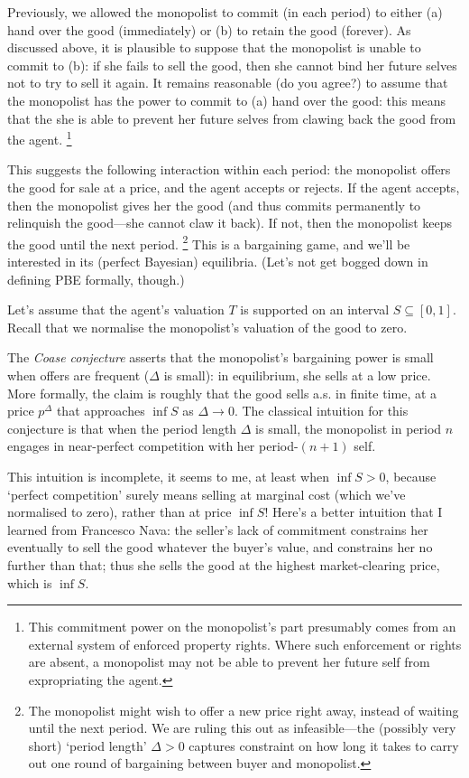 Previously, we allowed the monopolist to commit (in each period) to either (a) hand over the good (immediately) or (b) to retain the good (forever).
As discussed above, it is plausible to suppose that the monopolist is unable to commit to (b): if she fails to sell the good, then she cannot bind her future selves not to try to sell it again.
It remains reasonable (do you agree?) to assume that the monopolist has the power to commit to (a) hand over the good: this means that the she is able to prevent her future selves from clawing back the good from the agent.%
	\footnote{This commitment power on the monopolist's part presumably comes from an external system of enforced property rights. Where such enforcement or rights are absent, a monopolist may not be able to prevent her future self from expropriating the agent.}

This suggests the following interaction within each period: the monopolist offers the good for sale at a price, and the agent accepts or rejects.
If the agent accepts, then the monopolist gives her the good (and thus commits permanently to relinquish the good---she cannot claw it back).
If not, then the monopolist keeps the good until the next period.%
	\footnote{The monopolist might wish to offer a new price right away, instead of waiting until the next period. We are ruling this out as infeasible---the (possibly very short) `period length' $\Delta>0$ captures constraint on how long it takes to carry out one round of bargaining between buyer and monopolist.}
This is a bargaining game, and we'll be interested in its (perfect Bayesian) equilibria. (Let's not get bogged down in defining PBE formally, though.)

Let's assume that the agent's valuation $T$ is supported on an interval $S \subseteq [0,1]$. Recall that we normalise the monopolist's valuation of the good to zero.

The \emph{Coase conjecture} asserts that the monopolist's bargaining power is small when offers are frequent ($\Delta$ is small): in equilibrium, she sells at a low price.
More formally, the claim is roughly that the good sells a.s. in finite time,
at a price $p^\Delta$ that approaches $\inf S$ as $\Delta \to 0$.
The classical intuition for this conjecture is that when the period length $\Delta$ is small, the monopolist in period $n$ engages in near-perfect competition with her period-$(n+1)$ self.

This intuition is incomplete, it seems to me, at least when $\inf S > 0$, because `perfect competition' surely means selling at marginal cost (which we've normalised to zero), rather than at price $\inf S$!
Here's a better intuition that I learned from Francesco Nava: the seller's lack of commitment constrains her eventually to sell the good whatever the buyer's value, and constrains her no further than that; thus she sells the good at the highest market-clearing price, which is $\inf S$.

